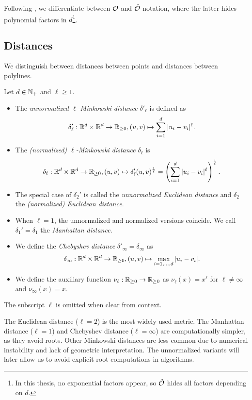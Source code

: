 Following \citeauthor{polyline_simplification_has_cubic_complexity_bringmannetal}, we differentiate between \(\mathcal{O}\) and \(\hat{\mathcal{O}}\) notation, where the latter hides polynomial factors in \(d\)\footnote{In this thesis, no exponential factors appear, so \(\hat{\mathcal{O}}\) hides all factors depending on \(d\).}.

\subsection{Distances}
\label{ssec:distances}
We distinguish between distances between points and distances between polylines.

\begin{definition}[Distances]\label{def:point_distance}
  Let \(d \in \mathbb{N}_+\) and \(\ell \geq 1\).
  \begin{itemize}
    \item The \emph{unnormalized \(\ell\)-Minkowski distance} \(\delta'_\ell\) is defined as
      \[\delta'_\ell:\mathbb{R}^d \times \mathbb{R}^d \to \mathbb{R}_{\geq 0}, (u, v) \mapsto \sum_{i = 1}^d |u_i - v_i|^\ell.\]
    \item The \emph{(normalized) \(\ell\)-Minkowski distance} \(\delta_\ell\) is
      \[\delta_\ell:\mathbb{R}^d \times \mathbb{R}^d \to \mathbb{R}_{\geq 0}, (u, v) \mapsto \delta'_\ell(u, v)^{\frac1\ell} = \left(\sum_{i = 1}^d |u_i - v_i|^\ell\right)^{\frac1\ell}.\]
    \item The special case of \(\delta_2'\) is called the \emph{unnormalized Euclidean distance} and \(\delta_2\) the \emph{(normalized) Euclidean distance}.
    \item When \(\ell = 1\), the unnormalized and normalized versions coincide. We call \(\delta_1' = \delta_1\) the \emph{Manhattan distance}.
    \item We define the \emph{Chebyshev distance} \(\delta'_\infty = \delta_\infty\) as
      \[\delta_\infty:\mathbb{R}^d \times \mathbb{R}^d \to \mathbb{R}_{\geq 0}, (u, v) \mapsto \max_{i = 1, \dots, d} |u_i - v_i|.\]
    \item We define the auxiliary function \(\nu_\ell:\mathbb{R}_{\geq 0} \to \mathbb{R}_{\geq 0}\) as \(\nu_\ell(x) = x^\ell\) for \(\ell \neq \infty\) and \(\nu_\infty(x) = x\).
  \end{itemize}
  The subscript \(\ell\) is omitted when clear from context.
\end{definition}

The Euclidean distance (\(\ell = 2\)) is the most widely used metric. The Manhattan distance (\(\ell = 1\)) and Chebyshev distance (\(\ell = \infty\)) are computationally simpler, as they avoid roots.
Other Minkowski distances are less common due to numerical instability and lack of geometric interpretation. The unnormalized variants will later allow us to avoid explicit root computations in algorithms.

